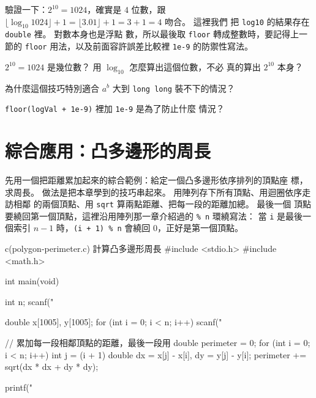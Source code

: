 
驗證一下：$2^{10} = 1024$，確實是 $4$ 位數，跟 $\lfloor \log_{10} 1024
\rfloor + 1 = \lfloor 3.01 \rfloor + 1 = 3 + 1 = 4$ 吻合。 這裡我們
把 \texttt{log10} 的結果存在 \texttt{double} 裡。 對數本身也是浮點
數，所以最後取 \texttt{floor} 轉成整數時，要記得上一節的 \texttt{floor} 用法，以及前面容許誤差比較裡 \texttt{1e-9} 的防禦性寫法。


\begin{drills}[label=drills:float-log-digits]
\item $2^{10} = 1024$ 是幾位數？ 用 $\log_{10}$ 怎麼算出這個位數，不必
真的算出 $2^{10}$ 本身？
\item 為什麼這個技巧特別適合 $a^b$ 大到 \texttt{long long} 裝不下的情況？
\item \texttt{floor(logVal + 1e-9)} 裡加 \texttt{1e-9} 是為了防止什麼
情況？
\end{drills}

\section{綜合應用：凸多邊形的周長}
\label{sec:float-polygon-perimeter}

先用一個把距離累加起來的綜合範例：給定一個凸多邊形依序排列的頂點座
標，求周長。
做法是把本章學到的技巧串起來。 用陣列存下所有頂點、用迴圈依序走訪相鄰
的兩個頂點、用 \texttt{sqrt} 算兩點距離、把每一段的距離加總。 最後一個
頂點要繞回第一個頂點，這裡沿用陣列那一章介紹過的 \texttt{\% n} 環繞寫法：
當 \texttt{i} 是最後一個索引 $n - 1$ 時，\texttt{(i + 1) \% n} 會繞回
$0$，正好是第一個頂點。

\begin{example}{c}{(polygon-perimeter.c) 計算凸多邊形周長}
#include <stdio.h>
#include <math.h>

int main(void) {
    int n;
    scanf("%

    double x[1005], y[1005];
    for (int i = 0; i < n; i++) {
        scanf("%
    }

    // 累加每一段相鄰頂點的距離，最後一段用 %
    double perimeter = 0;
    for (int i = 0; i < n; i++) {
        int j = (i + 1) %
        double dx = x[j] - x[i], dy = y[j] - y[i];
        perimeter += sqrt(dx * dx + dy * dy);
    }

    printf("%
}
\end{example}

